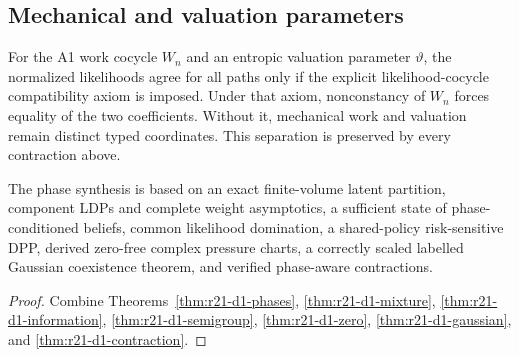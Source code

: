 \subsection{Mechanical and valuation parameters}

For the A1 work cocycle $W_n$ and an entropic valuation parameter $\vartheta$,
the normalized likelihoods agree for all paths only if the explicit
likelihood-cocycle compatibility axiom is imposed.  Under that axiom,
nonconstancy of $W_n$ forces equality of the two coefficients.  Without it,
mechanical work and valuation remain distinct typed coordinates.  This
separation is preserved by every contraction above.

\begin{theorem}
\label{thm:r21-d1-main}
The phase synthesis is based on an exact finite-volume latent partition,
component LDPs and complete weight asymptotics, a sufficient state of
phase-conditioned beliefs, common likelihood domination, a shared-policy
risk-sensitive DPP, derived zero-free complex pressure charts, a correctly
scaled labelled Gaussian coexistence theorem, and verified phase-aware
contractions.
\end{theorem}

\begin{proof}
Combine Theorems~\ref{thm:r21-d1-phases},
\ref{thm:r21-d1-mixture}, \ref{thm:r21-d1-information},
\ref{thm:r21-d1-semigroup}, \ref{thm:r21-d1-zero},
\ref{thm:r21-d1-gaussian}, and \ref{thm:r21-d1-contraction}.
\end{proof}
